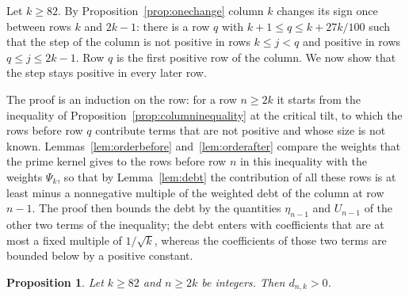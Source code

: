\documentclass{amsart}
\makeatletter
\newtheorem{proposition}[theorem]{Proposition}
\theoremstyle{definition}
\theoremstyle{remark}
\numberwithin{equation}{section}
\def\subsection{\@startsection{subsection}{2}\z@{.5\linespacing\@plus.7\linespacing}{-.5em}{\normalfont\bfseries\boldmath}}
\makeatother
\begin{document}
\subsection{Columns $k\ge82$}\label{subsec:beyond-large}

Let $k\ge82$. By Proposition~\ref{prop:onechange} column $k$ changes its
sign once between rows $k$ and $2k-1$: there is a row $q$ with
$k+1\le q\le k+27k/100$ such that the step of the column is not positive in
rows $k\le j<q$ and positive in rows $q\le j\le2k-1$. Row $q$ is
the first positive row of the column. We now show that the step stays
positive in every later row.

The proof is an induction on the row: for a row $n\ge2k$ it starts from the
inequality of Proposition~\ref{prop:columninequality} at the critical tilt,
to which the rows before row $q$ contribute terms that are not positive and
whose size is not known. Lemmas~\ref{lem:orderbefore}
and~\ref{lem:orderafter} compare the weights that the prime kernel gives to
the rows before row $n$ in this inequality with the weights $\Psi_k$, so
that by Lemma~\ref{lem:debt} the contribution of all these rows is at least
minus a nonnegative multiple of the weighted debt of the column at row
$n-1$. The proof then bounds the debt by the quantities $\eta_{n-1}$ and
$U_{n-1}$ of the other two terms of the inequality; the debt enters with
coefficients that are at most a fixed multiple of $1/\sqrt k$, whereas the
coefficients of those two terms are bounded below by a positive constant.

\begin{proposition}\label{prop:largecolumns}
Let $k\ge82$ and $n\ge2k$ be integers. Then $d_{n,k}>0$.
\end{proposition}
\end{document}
